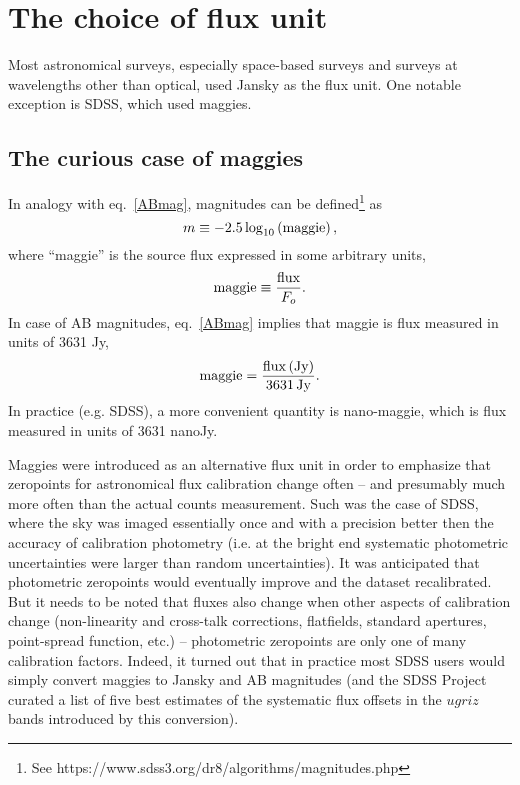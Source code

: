 \documentclass{emulateapj}
\begin{document}
\section{The choice of flux unit}  

Most astronomical surveys, especially space-based surveys and surveys
at wavelengths other than optical, used Jansky as the flux unit.  One notable
exception is SDSS, which used maggies. 


\subsection{The curious case of maggies} 

In analogy with eq.~\ref{ABmag}, magnitudes can be defined\footnote{
See https://www.sdss3.org/dr8/algorithms/magnitudes.php} as 
\begin{equation}
\label{maggie}
               m \equiv - 2.5\log_{10}\left({\rm maggie}\right),
\end{equation}
where ``maggie'' is the source flux expressed in some arbitrary
units,
\begin{equation}
\label{maggie2}
               {\rm maggie} \equiv {{\rm flux } \over F_o}. 
\end{equation}
In case of AB magnitudes, eq.~\ref{ABmag} implies that maggie is 
flux measured in units of 3631 Jy, 
\begin{equation}
\label{eq:defmaggie} 
           {\rm maggie} = {{\rm flux \, (Jy)} \over {\rm 3631 \, Jy}}. 
\end{equation} 
In practice (e.g. SDSS), a more convenient
quantity is nano-maggie, which is flux measured in units of 3631 nanoJy.


Maggies were introduced as an alternative flux unit in order to emphasize
that zeropoints for astronomical flux calibration change often -- and 
presumably much more often than the actual counts measurement. Such 
was the case of SDSS, where the sky was imaged essentially once and with
a precision better then the accuracy of calibration photometry (i.e. at 
the bright end systematic photometric uncertainties were larger than 
random uncertainties). It was anticipated that photometric zeropoints 
would eventually improve and the dataset recalibrated.  But it needs to 
be noted that fluxes also change when other aspects of calibration change
(non-linearity and cross-talk corrections, flatfields, standard apertures, 
point-spread function, etc.) -- photometric zeropoints are only one of 
many calibration factors. Indeed, it turned out that in practice most 
SDSS users would simply convert maggies to Jansky and AB magnitudes
(and the SDSS Project curated a list of five best estimates of the systematic
flux offsets in the $ugriz$ bands introduced by this conversion). 
 
\end{document}
